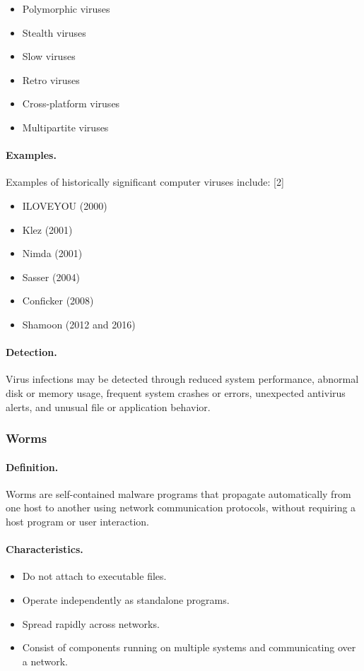 \begin{itemize}
  \item Polymorphic viruses
  \item Stealth viruses
  \item Slow viruses
  \item Retro viruses
  \item Cross-platform viruses
  \item Multipartite viruses
\end{itemize}

\paragraph{Examples.}
Examples of historically significant computer viruses include: [2]

\begin{itemize}
  \item ILOVEYOU (2000)
  \item Klez (2001)
  \item Nimda (2001)
  \item Sasser (2004)
  \item Conficker (2008)
  \item Shamoon (2012 and 2016)
\end{itemize}

\paragraph{Detection.}
Virus infections may be detected through reduced system performance, abnormal disk or memory usage, frequent system crashes or errors, unexpected antivirus alerts, and unusual file or application behavior.

\subsubsection{Worms}

\paragraph{Definition.}
Worms are self-contained malware programs that propagate automatically from one host to another using network communication protocols, without requiring a host program or user interaction.

\paragraph{Characteristics.}
\begin{itemize}
  \item Do not attach to executable files.
  \item Operate independently as standalone programs.
  \item Spread rapidly across networks.
  \item Consist of components running on multiple systems and communicating over a network.
\end{itemize}

